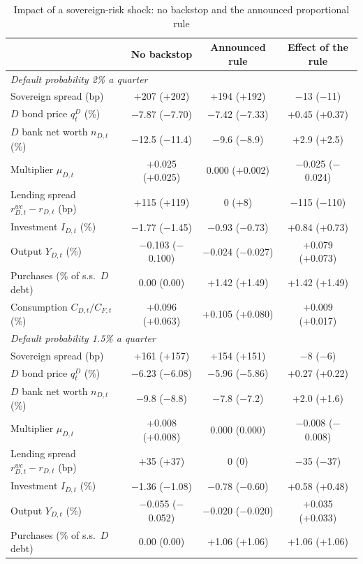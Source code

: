 \begin{table}[htbp]
\centering
\caption{Impact of a sovereign-risk shock: no backstop and the announced proportional rule}
\label{tab:headline-impact}
\small
\begin{tabular}{lccc}
\toprule
 & No backstop & Announced rule & Effect of the rule \\
\midrule
\multicolumn{4}{l}{\emph{Default probability 2\% a quarter}} \\
Sovereign spread (bp) & +207 (+202) & +194 (+192) & $-$13 ($-$11) \\
$D$ bond price $q^D_t$ (\%) & $-$7.87 ($-$7.70) & $-$7.42 ($-$7.33) & +0.45 (+0.37) \\
$D$ bank net worth $n_{D,t}$ (\%) & $-$12.5 ($-$11.4) & $-$9.6 ($-$8.9) & +2.9 (+2.5) \\
Multiplier $\mu_{D,t}$ & +0.025 (+0.025) & 0.000 (+0.002) & $-$0.025 ($-$0.024) \\
Lending spread $r^{wc}_{D,t}-r_{D,t}$ (bp) & +115 (+119) & 0 (+8) & $-$115 ($-$110) \\
Investment $I_{D,t}$ (\%) & $-$1.77 ($-$1.45) & $-$0.93 ($-$0.73) & +0.84 (+0.73) \\
Output $Y_{D,t}$ (\%) & $-$0.103 ($-$0.100) & $-$0.024 ($-$0.027) & +0.079 (+0.073) \\
Purchases (\% of s.s.\ $D$ debt) & 0.00 (0.00) & +1.42 (+1.49) & +1.42 (+1.49) \\
Consumption $C_{D,t}/C_{F,t}$ (\%) & +0.096 (+0.063) & +0.105 (+0.080) & +0.009 (+0.017) \\
\midrule
\multicolumn{4}{l}{\emph{Default probability 1.5\% a quarter}} \\
Sovereign spread (bp) & +161 (+157) & +154 (+151) & $-$8 ($-$6) \\
$D$ bond price $q^D_t$ (\%) & $-$6.23 ($-$6.08) & $-$5.96 ($-$5.86) & +0.27 (+0.22) \\
$D$ bank net worth $n_{D,t}$ (\%) & $-$9.8 ($-$8.8) & $-$7.8 ($-$7.2) & +2.0 (+1.6) \\
Multiplier $\mu_{D,t}$ & +0.008 (+0.008) & 0.000 (0.000) & $-$0.008 ($-$0.008) \\
Lending spread $r^{wc}_{D,t}-r_{D,t}$ (bp) & +35 (+37) & 0 (0) & $-$35 ($-$37) \\
Investment $I_{D,t}$ (\%) & $-$1.36 ($-$1.08) & $-$0.78 ($-$0.60) & +0.58 (+0.48) \\
Output $Y_{D,t}$ (\%) & $-$0.055 ($-$0.052) & $-$0.020 ($-$0.020) & +0.035 (+0.033) \\
Purchases (\% of s.s.\ $D$ debt) & 0.00 (0.00) & +1.06 (+1.06) & +1.06 (+1.06) \\

\end{tabular}
\end{table}
